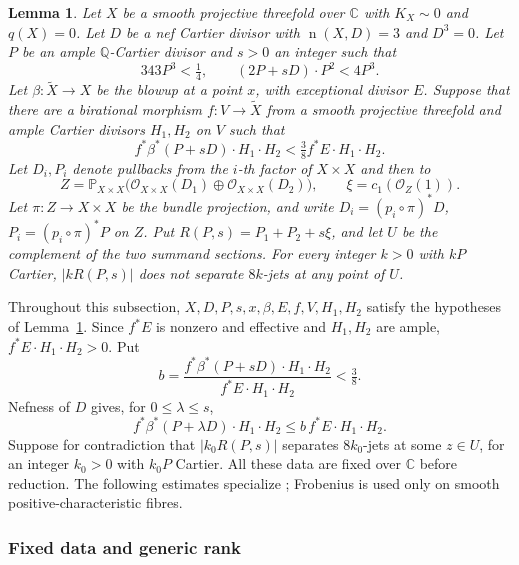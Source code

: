 \documentclass[12pt,a4paper,psamsfonts]{amsart}
\theoremstyle{definition}
\theoremstyle{plain}
\newtheorem{lemma}{Lemma}[section]
\newcommand{\C}{\mathbb C}
\newcommand{\OO}{\mathcal O}
\newcommand{\nef}{\operatorname{n}}
\begin{document}
\begin{lemma}\label{lem:full-contradiction}
Let $X$ be a smooth projective threefold over $\C$ with
$K_X\sim0$ and $q(X)=0$. Let $D$ be a nef Cartier divisor with
$\nef(X,D)=3$ and $D^3=0$. Let $P$ be an ample $\mathbb{Q}$-Cartier
divisor and $s>0$ an integer such that
\[
 343P^3<\tfrac14,\qquad (2P+sD)\cdot P^2<4P^3.
\]
Let $\beta:\widetilde X\to X$ be the blowup at a point $x$, with
exceptional divisor $E$. Suppose that there are a birational morphism
$f:V\to\widetilde X$ from a smooth projective threefold and ample
Cartier divisors $H_1,H_2$ on $V$ such that
\[
 f^*\beta^*(P+sD)\cdot H_1\cdot H_2
 <\tfrac38 f^*E\cdot H_1\cdot H_2.
\]
Let $D_i,P_i$ denote pullbacks from the $i$-th factor of $X\times X$
and then to
\[
 Z=\mathbb P_{X\times X}
   \bigl(\OO_{X\times X}(D_1)\oplus\OO_{X\times X}(D_2)\bigr),
 \qquad \xi=c_1(\OO_Z(1)).
\]
Let $\pi:Z\to X\times X$ be the bundle projection, and write
$D_i=(p_i\circ\pi)^*D$, $P_i=(p_i\circ\pi)^*P$ on $Z$.
Put $R(P,s)=P_1+P_2+s\xi$, and let $U$ be the complement
of the two summand sections. For every integer $k>0$ with $kP$
Cartier, $|kR(P,s)|$ does not separate $8k$-jets at any point
of $U$.
\end{lemma}

Throughout this subsection, $X,D,P,s,x,\beta,E,f,V,H_1,H_2$ satisfy
the hypotheses of Lemma~\ref{lem:full-contradiction}. Since $f^*E$
is nonzero and effective and $H_1,H_2$ are ample,
$f^*E\cdot H_1\cdot H_2>0$. Put
\[
 b=\frac{f^*\beta^*(P+sD)\cdot H_1\cdot H_2}
 {f^*E\cdot H_1\cdot H_2}<\tfrac38.
\]
Nefness of $D$ gives, for $0\le\lambda\le s$,
\[
 f^*\beta^*(P+\lambda D)\cdot H_1\cdot H_2
 \le b\,f^*E\cdot H_1\cdot H_2.
\]
Suppose for contradiction that $|k_0R(P,s)|$ separates $8k_0$-jets
at some $z\in U$, for an integer $k_0>0$ with $k_0P$ Cartier.
All these data are fixed over $\C$ before reduction. The following
estimates specialize \cite[Theorem~6.1]{NS}; Frobenius is used
only on smooth positive-characteristic fibres.

\subsubsection{Fixed data and generic rank}
\end{document}
